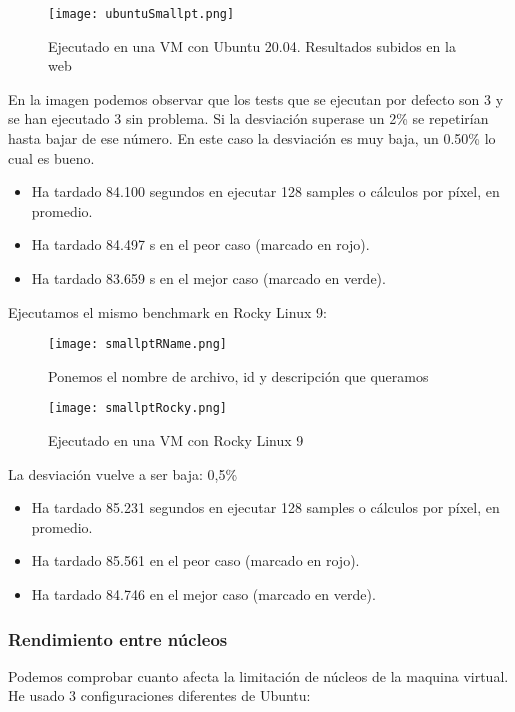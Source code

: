 \begin{figure}[H]
	\centering
	\texttt{[image: ubuntuSmallpt.png]}
	\caption{Ejecutado en una VM con Ubuntu 20.04. Resultados subidos en la web \cite{ubuntuSmallpt}}
\end{figure}
En la imagen podemos observar que los tests que se ejecutan por defecto son 3 y se han ejecutado 3 sin problema. Si la desviación superase un 2\% se repetirían hasta bajar de ese número. En este caso la desviación es muy baja, un 0.50\% lo cual es bueno.
\begin{itemize}
	\item Ha tardado 84.100 segundos en ejecutar 128 samples o cálculos por píxel, en promedio.
	\item Ha tardado 84.497 s en el peor caso (marcado en rojo).
	\item Ha tardado 83.659 s en el mejor caso (marcado en verde).
\end{itemize}

\newpage

Ejecutamos el mismo benchmark en Rocky Linux 9:
\begin{figure}[H]
	\centering
	\texttt{[image: smallptRName.png]}
	\caption{Ponemos el nombre de archivo, id y descripción que queramos}
\end{figure}

\begin{figure}[H]
	\centering
	\texttt{[image: smallptRocky.png]}
	\caption{Ejecutado en una VM con Rocky Linux 9}
\end{figure}
La desviación vuelve a ser baja: 0,5\%
\begin{itemize}
	\item Ha tardado 85.231 segundos en ejecutar 128 samples o cálculos por píxel, en promedio.
	\item Ha tardado 85.561 en el peor caso (marcado en rojo).
	\item Ha tardado 84.746 en el mejor caso (marcado en verde).
\end{itemize}

\subsubsection{Rendimiento entre núcleos}
Podemos comprobar cuanto afecta la limitación de núcleos de la maquina virtual. He usado 3 configuraciones diferentes de Ubuntu:

